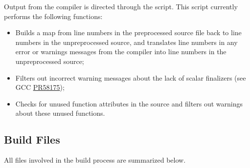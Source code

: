 Output from the  compiler is directed through the  script. This script currently performs the following functions:
\begin{itemize}
\item Builds a map from line numbers in the preprocessed source file back to line numbers in the unpreprocessed source, and translates line numbers in any error or warnings messages from the compiler into line numbers in the unpreprocessed source;
\item Filters out incorrect warning messages about the lack of scalar finalizers (see GCC \href{https://gcc.gnu.org/bugzilla/show_bug.cgi?id=58175}{PR58175});
\item Checks for unused function attributes in the source and filters out warnings about these unused functions.
\end{itemize}

\subsection{Build Files}

All files involved in the build process are summarized below.

